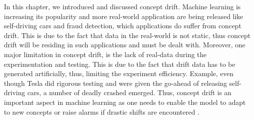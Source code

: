 In this chapter, we introduced and discussed concept drift. Machine learning is increasing its popularity and more real-world application are being released like self-driving cars and fraud detection, which applications do suffer from concept drift. This is due to the fact that data in the real-world is not static, thus concept drift will be residing in such applications and must be dealt with.  
Moreover, one major limitation in concept drift, is the lack of real-data during the experimentation and testing. This is due to the fact that drift data has to be generated artificially, thus, limiting the experiment efficiency. Example, even though Tesla did rigorous testing and were given the go-ahead of releasing self-driving cars, a number of deadly crashed emerged. Thus, concept drift is an important aspect in machine learning as one needs to enable the model to adapt to new concepts or raise alarms if drastic shifts are encountered \citep{Stewart2018}. 






